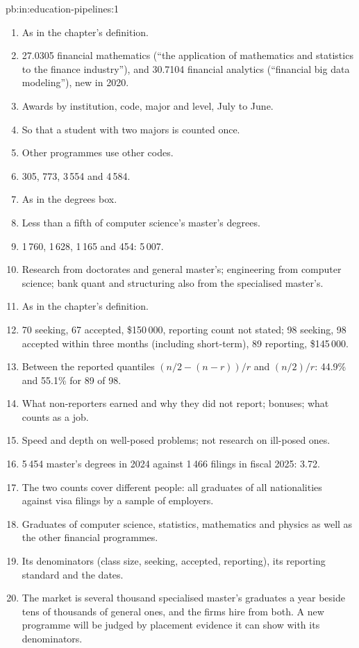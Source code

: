 \begin{solution}{pb:in:education-pipelines:1}
\begin{enumerate}
\item As in the chapter's definition.
\item 27.0305 financial mathematics (``the application of mathematics and statistics to the finance industry''), and
30.7104 financial analytics (``financial big data modeling''), new in 2020.
\item Awards by institution, code, major and level, July to June.
\item So that a student with two majors is counted once.
\item Other programmes use other codes.
\item 305, 773, 3\,554 and 4\,584.
\item As in the degrees box.
\item Less than a fifth of computer science's master's degrees.
\item 1\,760, 1\,628, 1\,165 and 454: 5\,007.
\item Research from doctorates and general master's; engineering from computer science; bank quant and structuring also
from the specialised master's.
\item As in the chapter's definition.
\item 70 seeking, 67 accepted, \$150\,000, reporting count not stated; 98 seeking, 98 accepted within three months
(including short-term), 89 reporting, \$145\,000.
\item Between the reported quantiles $(n/2-(n-r))/r$ and $(n/2)/r$: 44.9\% and 55.1\% for 89 of 98.
\item What non-reporters earned and why they did not report; bonuses; what counts as a job.
\item Speed and depth on well-posed problems; not research on ill-posed ones.
\item 5\,454 master's degrees in 2024 against 1\,466 filings in fiscal 2025: 3.72.
\item The two counts cover different people: all graduates of all nationalities against visa filings by a sample of
employers.
\item Graduates of computer science, statistics, mathematics and physics as well as the other financial programmes.
\item Its denominators (class size, seeking, accepted, reporting), its reporting standard and the dates.
\item The market is several thousand specialised master's graduates a year beside tens of thousands of general ones, and
the firms hire from both. A new programme will be judged by placement evidence it can show with its denominators.
\end{enumerate}
\end{solution}

